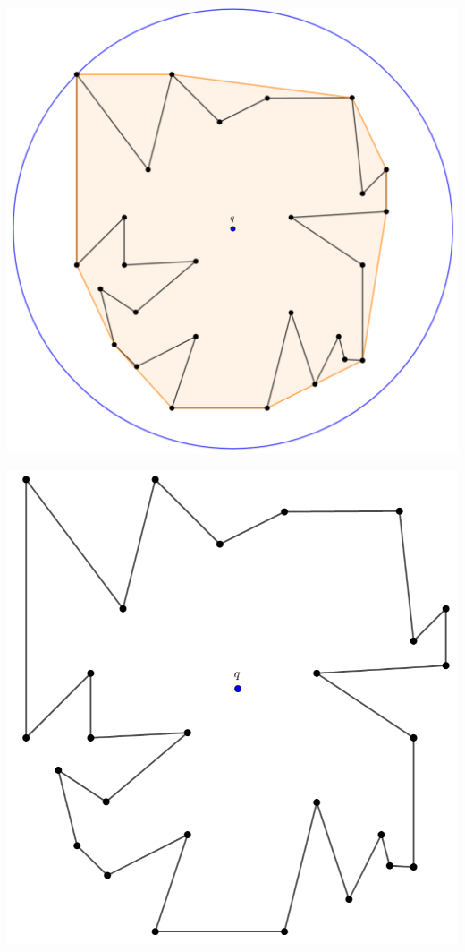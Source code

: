 {\begin{frame}
  \centering \includegraphics[width=0.55 \paperwidth]{images/V(q)03.png}
\end{frame}

\begin{frame}
  \centering \includegraphics[width=0.55 \paperwidth]{images/V(q)04.png}
\end{frame}

}
